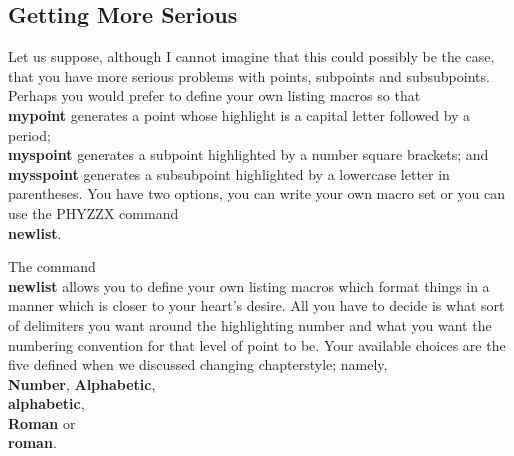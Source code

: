 \subsection{Getting More Serious}
 
Let us suppose, although I cannot imagine that this could possibly
be the case, that you have more serious problems with points, subpoints
and subsubpoints.
Perhaps you would prefer to define your own listing macros
so that {\bf \\mypoint} generates a point whose highlight
is a capital letter followed by a period; {\bf \\myspoint}
generates a subpoint highlighted by a number square brackets;
and {\bf \\mysspoint} generates a subsubpoint highlighted
by a lowercase letter in parentheses.
You have two options, you can write your own macro set
or you can use the PHYZZX command {\bf \\newlist}.
 
The command {\bf \\newlist} allows you to define your own
listing macros which format things in a manner which is closer
to your heart's desire.
All you have to decide is what sort of delimiters you want
around the highlighting number and what you want the numbering
convention for that level of point to be.
Your available choices are the five defined when we discussed
changing chapterstyle; namely, {\bf \\Number},
{\bf Alphabetic}, {\bf \\alphabetic},
{\bf \\Roman} or {\bf \\roman}.
 
